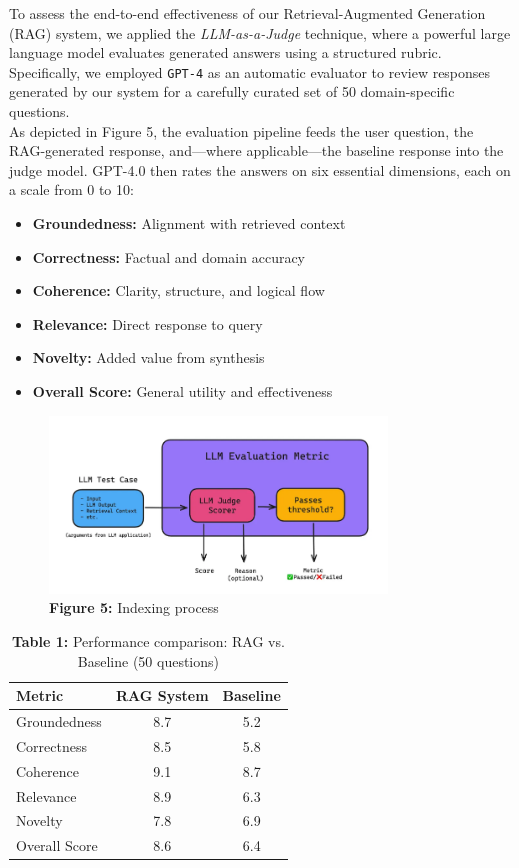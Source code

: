 To assess the end-to-end effectiveness of our Retrieval-Augmented Generation (RAG) system, we applied the \textit{LLM-as-a-Judge} technique, where a powerful large language model evaluates generated answers using a structured rubric. Specifically, we employed \texttt{GPT-4} as an automatic evaluator to review responses generated by our system for a carefully curated set of 50 domain-specific questions.\\
As depicted in Figure 5, the evaluation pipeline feeds the user question, the RAG-generated response, and—where applicable—the baseline response into the judge model. GPT-4.0 then rates the answers on six essential dimensions, each on a scale from 0 to 10:
\begin{itemize}
    \item \textbf{Groundedness:} Alignment with retrieved context
    \item \textbf{Correctness:} Factual and domain accuracy
    \item \textbf{Coherence:} Clarity, structure, and logical flow
    \item \textbf{Relevance:} Direct response to query
    \item \textbf{Novelty:} Added value from synthesis
    \item \textbf{Overall Score:} General utility and effectiveness
\end{itemize}
\begin{figure}[htbp]
  \centering
  \includegraphics[width=0.8\textwidth]{images/LLM_AS_JUDGE.png}
  \caption*{\textbf{Figure 5:} Indexing process} %
  \label{fig:indexing-process-manual}
\end{figure}

\begin{table}[h]
    \centering
    \begin{tabular}{lcc}
        \toprule
        \textbf{Metric} & \textbf{RAG System} & \textbf{Baseline} \\
        \midrule
        Groundedness & 8.7 & 5.2 \\
        Correctness & 8.5 & 5.8 \\
        Coherence & 9.1 & 8.7 \\
        Relevance & 8.9 & 6.3 \\
        Novelty & 7.8 & 6.9 \\
        Overall Score & 8.6 & 6.4 \\
        \bottomrule
    \end{tabular}
    \caption*{\textbf{Table 1:} Performance comparison: RAG vs. Baseline (50 questions)}
    \label{tab:rag-vs-baseline}
\end{table}


